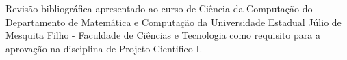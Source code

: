 \thispagestyle{empty}

\begin{center}
    \titulo
\end{center}

\vspace{6cm}

\begin{natureza}
    Revisão bibliográfica apresentado ao curso de Ciência da Computação do Departamento de Matemática e Computação da Universidade Estadual Júlio de Mesquita Filho - Faculdade de Ciências e Tecnologia como requisito para a aprovação na disciplina de Projeto Cientifico I.
\end{natureza}

\vspace*{\fill}

\begin{center}
    \uppercase{\cidadeestado\\\the\year{}}
\end{center}